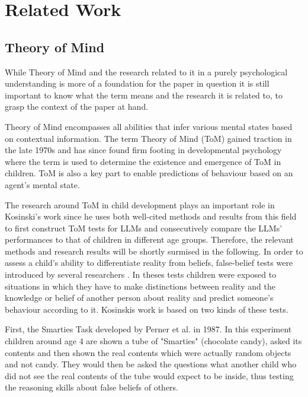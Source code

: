 \section{Related Work}
\subsection{Theory of Mind}
While Theory of Mind and the research related to it in a purely psychological understanding is more of a foundation for the paper in question it is still important to know what the term means and the research it is related to, to grasp the context of the paper at hand.

Theory of Mind encompasses all abilities that infer various mental states based on contextual information. The term Theory of Mind (ToM) gained traction in the late 1970s and has since found firm footing in developmental psychology where the term is used to determine the existence and emergence of ToM in children. ToM is also a key part to enable predictions of behaviour based on an agent's mental state.\cite{theory_of_mind}

The research around ToM in child development plays an important role in Kosinski's work since he uses both well-cited methods and results from this field to first construct ToM tests for LLMs and consecutively compare the LLMs' performances to that of children in different age groups. Therefore, the relevant methods and research results will be shortly surmised in the following. In order to assess a child's ability to differentiate reality from beliefs, false-belief tests were introduced by several researchers \cite{fb_test_places_1,fb_test_places_2,fb_test_contents}. In theses tests children were exposed to situations in which they have to make distinctions between reality and the knowledge or belief of another person about reality and predict someone's behaviour according to it. Kosinskis work is based on two kinds of these tests.

First, the Smarties Task developed by Perner et al. in 1987. In this experiment children around age 4 are shown a tube of "Smarties" (chocolate candy), asked its contents and then shown the real contents which were actually random objects and not candy. They would then be asked the questions what another child who did not see the real contents of the tube would expect to be inside, thus testing the reasoning skills about false beliefs of others. \cite{fb_test_contents}

